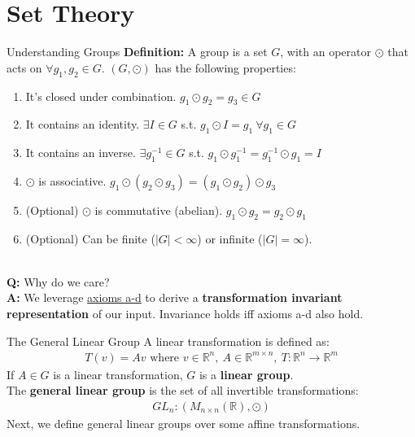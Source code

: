 \documentclass{beamer}
\begin{document}
\section{Set Theory}
\begin{frame}{Understanding Groups}
	\textbf{Definition:} A group is a set $G$, with an operator $\odot$ that acts on $\forall g_1, g_2 \in G$. \pause $(G, \odot)$ has the following properties:
	\begin{enumerate}[label=\alph*.]
		\item It's closed under combination. $g_1 \odot g_2 = g_3 \in G$ \pause
		\item It contains an identity. $\exists I \in G$ s.t. $g_1 \odot I = g_1\ \forall g_1 \in G$ \pause
		\item It contains an inverse. $\exists g_1^{-1} \in G$ s.t. $g_1 \odot g_1^{-1} = g_1^{-1} \odot g_1 = I$ \pause
		\item $\odot$ is associative. $g_1 \odot (g_2 \odot g_3) = (g_1 \odot g_2) \odot g_3$ \pause
		\item (Optional) $\odot$ is commutative (abelian). $g_1 \odot g_2 = g_2 \odot g_1$ \pause
		\item (Optional) Can be finite ($|G| < \infty$) or infinite ($|G| = \infty$). \pause
	\end{enumerate}
	~\\

	\textbf{Q:} Why do we care? \pause \\
	\textbf{A:} We leverage \underline{axioms a-d} to derive a \textbf{transformation invariant representation} of our input. Invariance holds iff axioms a-d also hold.
\end{frame}

\begin{frame}{The General Linear Group}
	A linear transformation is defined as: 
	\begin{gather}
		T(v) = Av \text{ where } v \in \mathbb{R}^n,\ A \in \mathbb{R}^{m \times n},\ T: \mathbb{R}^{n} \rightarrow \mathbb{R}^m
	\end{gather} \pause
	If $A \in G$ is a linear transformation, $G$ is a \textbf{linear group}. \pause \newline \\

	The \textbf{general linear group} is the set of all invertible transformations:
	\begin{gather}
		GL_n: (M_{n \times n}(\mathbb{R}), \odot)
	\end{gather} \pause
	Next, we define general linear groups over some affine transformations.
\end{frame}
\end{document}
